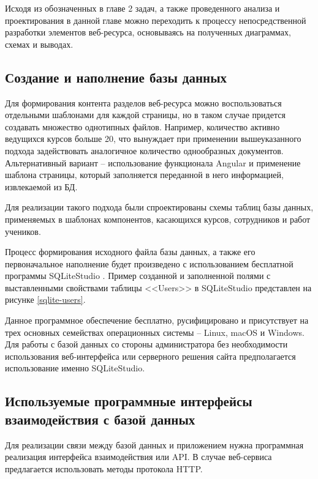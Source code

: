 Исходя из обозначенных в главе 2 задач, а также проведенного анализа и проектирования в данной главе можно переходить к процессу непосредственной разработки элементов веб-ресурса, основываясь на полученных диаграммах, схемах и выводах.


\subsection{Создание и наполнение базы данных}

Для формирования контента разделов веб-ресурса можно воспользоваться отдельными шаблонами для каждой страницы, но в таком случае придется создавать множество однотипных файлов.
Например, количество активно ведущихся курсов больше 20, что вынуждает при применении вышеуказанного подхода задействовать аналогичное количество однообразных документов.
Альтернативный вариант -- использование функционала Angular и применение шаблона страницы, который заполняется переданной в него информацией, извлекаемой из БД.

Для реализации такого подхода были спроектированы схемы таблиц базы данных, применяемых в шаблонах компонентов, касающихся курсов, сотрудников и работ учеников.

Процесс формирования исходного файла базы данных, а также его первоначальное наполнение будет произведено с использованием бесплатной программы SQLiteStudio \cite{sqlitestudio}.
Пример созданной и заполненной полями с выставленными свойствами таблицы <<Users>> в SQLiteStudio представлен на рисунке \ref{sqlite-users}.

Данное программное обеспечение бесплатно, русифицировано и присутствует на трех основных семействах операционных системы -- Linux, macOS и Windows.
Для работы с базой данных со стороны администратора без необходимости использования веб-интерфейса или серверного решения сайта предполагается использование именно SQLiteStudio.





\subsection{Используемые программные интерфейсы взаимодействия с базой данных}

Для реализации связи между базой данных и приложением нужна программная реализация интерфейса взаимодействия или API.
В случае веб-сервиса предлагается использовать методы протокола HTTP.

